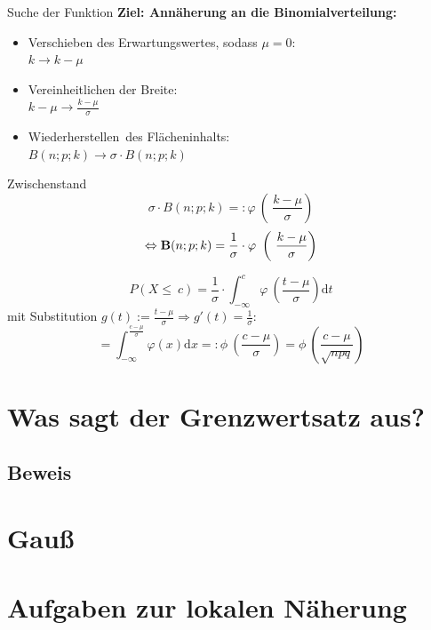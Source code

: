 \documentclass[14pt]{beamer}
\begin{document}
\begin{frame}{Suche der Funktion}
\textbf{Ziel: Annäherung an die Binomialverteilung:}
\pause
\begin{itemize}
\item Verschieben des Erwartungswertes, sodass $\mu=0$:\\
$k \to k-\mu$
\item Vereinheitlichen der Breite:\\
$k-\mu \to \frac{k-\mu}{\sigma}$
\pause
\item \glqq Wiederherstellen\grqq\ des Flächeninhalts:\\
$B(n;p;k) \to \sigma \cdot B(n;p;k)$
\end{itemize}

\end{frame}
\begin{frame}{Zwischenstand}
$$
\sigma \cdot B(n;p;k) =: \varphi\ \left(\ \frac{k-\mu}{\sigma}\right)
$$
$$
\Leftrightarrow
\begin{mathbf}
B(n;p;k) =  \frac{1}{\sigma} \cdot  \varphi\ \left(\ \frac{k-\mu}{\sigma}\right)
\end{mathbf}
$$
\end{frame}


\begin{frame}
$$
P(X\leq\ c) = \frac{1}{\sigma} \cdot \int^c_{-\infty} \varphi\ \left(\frac{t-\mu}{\sigma}\right) {\mathrm d}t
$$
mit Substitution $g(t):=\frac{t-\mu}{\sigma} \Rightarrow g'(t)=\frac{1}{\sigma}$:
$$
= \int^{\frac{c-\mu}{\sigma}}_{-\infty} \varphi(x) {\mathrm d}x =: \phi\ \left(\frac{c-\mu}{\sigma}\right) = \phi\ \left( \frac{c-\mu}{\sqrt{npq}}\right)
$$
\end{frame}




\section{Was sagt der Grenzwertsatz aus?} %
\subsection{Beweis} %
\section{Gauß} %
\section{Aufgaben zur lokalen Näherung}
\end{document}
